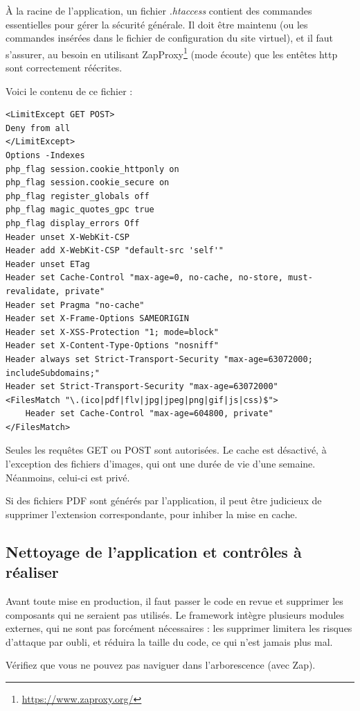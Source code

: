 À la racine de l'application, un fichier \textit{.htaccess} contient des commandes essentielles pour gérer la sécurité générale. Il doit être maintenu (ou les commandes insérées dans le fichier de configuration du site virtuel), et il faut s'assurer, au besoin en utilisant ZapProxy\footnote{\href{https://www.zaproxy.org/}{https://www.zaproxy.org/}} (mode écoute) que les entêtes http sont correctement réécrites.

Voici le contenu de ce fichier :

\begin{lstlisting}
<LimitExcept GET POST>
Deny from all
</LimitExcept>
Options -Indexes
php_flag session.cookie_httponly on
php_flag session.cookie_secure on
php_flag register_globals off
php_flag magic_quotes_gpc true
php_flag display_errors Off
Header unset X-WebKit-CSP
Header add X-WebKit-CSP "default-src 'self'"
Header unset ETag
Header set Cache-Control "max-age=0, no-cache, no-store, must-revalidate, private"
Header set Pragma "no-cache"
Header set X-Frame-Options SAMEORIGIN
Header set X-XSS-Protection "1; mode=block"
Header set X-Content-Type-Options "nosniff"
Header always set Strict-Transport-Security "max-age=63072000; includeSubdomains;"
Header set Strict-Transport-Security "max-age=63072000"
<FilesMatch "\.(ico|pdf|flv|jpg|jpeg|png|gif|js|css)$">
    Header set Cache-Control "max-age=604800, private"
</FilesMatch>

\end{lstlisting}

Seules les requêtes GET ou POST sont autorisées. Le cache est désactivé, à l'exception des fichiers d'images, qui ont une durée de vie d'une semaine. Néanmoins, celui-ci est privé.

Si des fichiers PDF sont générés par l'application, il peut être judicieux de supprimer l'extension correspondante, pour inhiber la mise en cache.

\subsection{Nettoyage de l'application et contrôles à réaliser}

Avant toute mise en production, il faut passer le code en revue et supprimer les composants qui ne seraient pas utilisés. Le framework intègre plusieurs modules externes, qui ne sont pas forcément nécessaires : les supprimer limitera les risques d'attaque par oubli, et réduira la taille du code, ce qui n'est jamais plus mal.

Vérifiez que vous ne pouvez pas naviguer dans l'arborescence (avec Zap).

